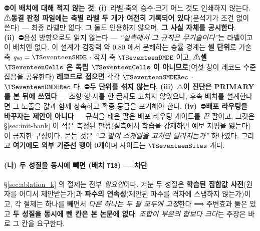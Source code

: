 \documentclass[11pt]{report}
\numberwithin{equation}{chapter}
\numberwithin{figure}{chapter}
\numberwithin{table}{chapter}
\begin{document}
⛔\textbf{이 배치에 대해 적지 않는 것}: \textbf{(i)}~라벨$\cdot$축의 승수$\cdot$크기 어느
것도 인쇄하지 않는다. ⚠\textbf{동결 판정 파일에는 축별 라벨 두 개가 여전히 기록되어
있다}(분석기가 조건 없이 쓴다) --- 최종 라벨만 없다. 그 둘도 인용하지 않으며, \textbf{그
사실 자체를 공시한다}. \textbf{(ii)}~⛔음성 방향으로도 읽지 않는다 --- \emph{``실측에서 그
규칙은 무기술이다''}는 라벨이고 이 배치엔 없다. 이 설계가 검정력 약 $0.80$ 에서 분해하는
승률 경계는 \textbf{셀 단위}로 기술 축 $q_{80} = \TSeventeenSMDE$ $\cdot$ 착지 축
$\TSeventeenDMDE$ 이고, ⚠\textbf{셀 $\TSeventeenCells$ 은 독립 $\TSeventeenCells$ 이
아니므로}(여섯 창이 레코드 수준 잡음을 공유한다) \textbf{레코드로 접으면} 각각
$\TSeventeenSMDERec$ $\cdot$ $\TSeventeenDMDERec$ 다. ⛔\textbf{두 단위를 섞지 않는다.} \textbf{(iii)}~⚠\textbf{이 진단은 PRIMARY 를 본 뒤에
쓰였다} --- 조항$\cdot$행$\cdot$자를 한 글자도 고치지 않았으나, 후속 배치를 설계한다면 그
노출을 값과 함께 상속하고 확증 등급을 포기해야 한다. \textbf{(iv)}~⛔\textbf{배포 라우팅을
바꾸자는 제안이 아니다} --- 규칙을 태운 팔은 배포 라우팅 게이트를 \emph{끈} 팔이고, 그것은
\S\ref{sec:init-bank} 이 적은 측정된 판정(실측에서 학습을 강제하면 예보 지평을 잃는다)이
금지한 구성이다. 묻는 것은 \emph{``그 팔이 스케일을 고치면 달라지는가''} 하나였다.
그리고 \textbf{여기에도 외부 기준선 행이 $0$개}이며 사이트는 $\TSeventeenSites$ 개다.

\paragraph{(나) 두 성질을 동시에 빼면 (배치 \texttt{T18}) --- 차단}
\S\ref{sec:ablation_k} 의 절제는 전부 \emph{일요인}이다. 겨눈 두 성질은
\textbf{학습된 집합값 사전}(원자를 어디서 제안받는가)과 \textbf{파수의 연속성}(제안된
파수를 격자에 스냅하지 않는가)이고, 각 절제는 하나를 빼면서 \emph{다른 하나는 두 팔 모두에
고정}한다 ⟹ 주변효과 둘은 있고 \textbf{두 성질을 동시에 뺀 칸은 본 논문에 없다}.
\emph{조합이 부분의 합보다 크다}는 주장은 바로 그 칸을 요구한다.
\end{document}

